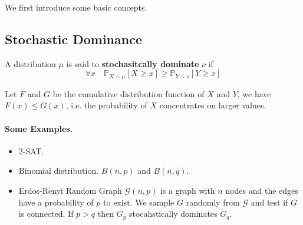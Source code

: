        We first introduce some basic concepts.

    \subsection{Stochastic Dominance}
        \begin{definition}
            A distribution $\mu$ is said to \textbf{stochasitcally dominate} $\nu$ if
            \[ \forall x\quad \mathbb{P}_{X\sim\mu}[X \ge x] \ge \mathbb{P}_{Y\sim\nu}[Y \ge x] \]
        \end{definition}
        \begin{remark}
            Let $F$ and $G$ be the cumulative distribution function of $X$ and $Y$, we have $F(x) \le G(x)$, i.e. the probability of $X$ concentrates on larger values.
        \end{remark}
        \paragraph{Some Examples.}
        \begin{itemize}
            \item 2-SAT.
            \item Binomial distribution. $B(n,p)$ and $B(n,q)$.
            \item Erd$\mathrm{\ddot{o}}$s-R$\mathrm{\acute{e}}$nyi Random Graph $\mathcal{G}(n,p)$ is a graph with $n$ nodes and the edges have a probability of $p$ to exist. We sample $G$ randomly from $\mathcal{G}$ and test if $G$ is connected. If $p>q$ then $G_p$ stocahstically dominates $G_q$.
        \end{itemize}

